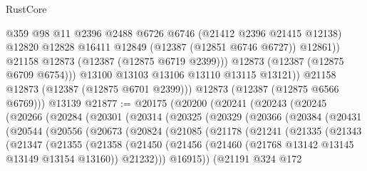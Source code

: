\begin{lexlean}{RustCore}
\begin{coremodule}
                    @359
                    @98
                    @11
                    @2396
                    @2488
                    @6726
                    @6746
                    (@21412 @2396 @21415 @12138)
                    @12820
                    @12828
                    @16411
                    @12849
                    (@12387 (@12851 @6746 @6727))
                    @12861))
                @21158
                @12873
                (@12387 (@12875 @6719 @2399)))
              @12873
              (@12387 (@12875 @6709 @6754)))
            @13100
            @13103
            @13106
            @13110
            @13115
            @13121))
        @21158
        @12873
        (@12387 (@12875 @6701 @2399)))
      @12873
      (@12387 (@12875 @6566 @6769)))
    @13139
@21877 := @20175
    (@20200
      (@20241
        (@20243
          (@20245
            (@20266
              (@20284
                (@20301
                  (@20314
                    (@20325
                      (@20329
                        (@20366
                          (@20384
                            (@20431
                              (@20544
                                (@20556
                                  (@20673
                                    (@20824
                                      (@21085
                                        (@21178
                                          (@21241
                                            (@21335
                                              (@21343
                                                (@21347
                                                  (@21355
                                                    (@21358
                                                      (@21450
                                                        (@21456
                                                          (@21460
                                                            (@21768
                                                              @13142
                                                              @13145
                                                              @13149
                                                              @13154
                                                              @13160))
                                                          @21232)))
                                                    @16915))
                                                (@21191
                                                  @324
                                                  @172

\end{coremodule}
\end{lexlean}

